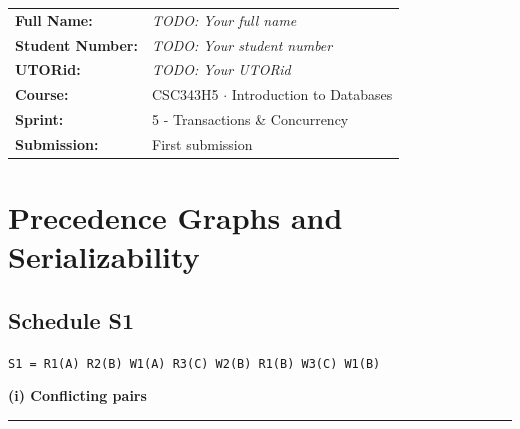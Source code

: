 \documentclass[11pt, a4paper]{article}
\newcommand{\sched}[1]{\texttt{#1}}
\newcommand{\divider}{\par\noindent\rule{\linewidth}{0.3pt}\smallskip}
\begin{document}
\begin{tabular}{ll}
  \textbf{Full Name:}      & \textit{TODO: Your full name} \\[3pt]
  \textbf{Student Number:} & \textit{TODO: Your student number} \\[3pt]
  \textbf{UTORid:}         & \textit{TODO: Your UTORid} \\[3pt]
  \textbf{Course:}         & CSC343H5 $\cdot$ Introduction to Databases \\[3pt]
  \textbf{Sprint:}         & 5 - Transactions \& Concurrency \\[3pt]
  \textbf{Submission:}     & First submission \\
\end{tabular}

\bigskip

\section{Precedence Graphs and Serializability}


\subsection{Schedule S1}

\noindent\sched{S1 = R1(A) R2(B) W1(A) R3(C) W2(B) R1(B) W3(C) W1(B)}

\bigskip
\textbf{(i) Conflicting pairs}
\divider
\end{document}
